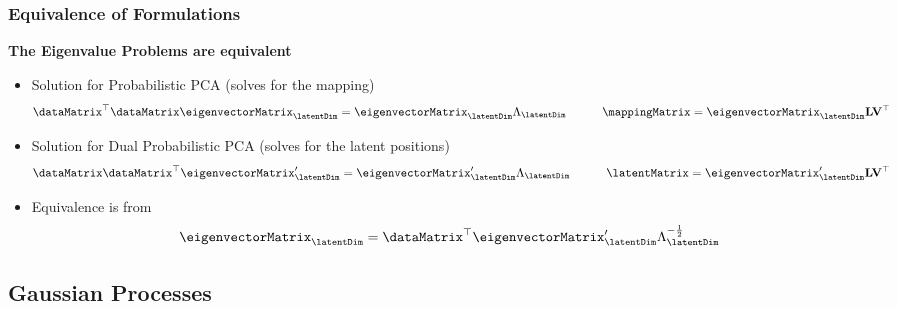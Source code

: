 \begin{frame}
  \frametitle{Equivalence of Formulations}

  \textbf{The Eigenvalue Problems are equivalent}
  \begin{itemize}
  \item Solution for Probabilistic PCA (solves for the mapping)
    {\footnotesize 
      \[
      \dataMatrix^{\top}\dataMatrix\eigenvectorMatrix_{\latentDim}=\eigenvectorMatrix_{\latentDim}\Lambda_{\latentDim}\quad\quad\quad\mappingMatrix=\eigenvectorMatrix_{\latentDim}\mathbf{L}\mathbf{V}^{\top}
      \]
    }

  \item Solution for Dual Probabilistic PCA (solves for the latent positions)
    {\footnotesize 
      \[
      \dataMatrix\dataMatrix^{\top}\eigenvectorMatrix_{\latentDim}^{\prime}=\eigenvectorMatrix_{\latentDim}^{\prime}\Lambda_{\latentDim}\quad\quad\quad\latentMatrix=\eigenvectorMatrix_{\latentDim}^{\prime}\mathbf{L}\mathbf{V}^{\top}
      \]
    }
    
  \item Equivalence is from
    {\footnotesize 
      \[
      \eigenvectorMatrix_{\latentDim}=\dataMatrix^{\top}\eigenvectorMatrix_{\latentDim}^{\prime}\Lambda_{\latentDim}^{-\frac{1}{2}}
      \]
    }
  \end{itemize}


\end{frame}

\subsection{Gaussian Processes}



